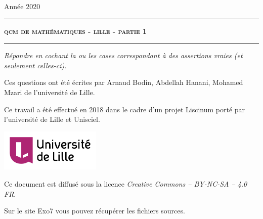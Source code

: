 \documentclass[12pt,a4paper]{article}
\begin{document}
 
 


\hfill{Ann\'ee 2020}

\vspace*{0.5ex}
\hrule\vspace*{1.5ex} 
\hfil\textsc{\textbf{\LARGE qcm de mathématiques - lille - partie 1}}
\vspace*{1.2ex} \hrule 
\vspace*{5ex} 


\vspace{4cm}

\begin{center}
\begin{minipage}{0.8\textwidth}
\center
\textit{Répondre en cochant la ou les cases correspondant à des assertions vraies (et seulement celles-ci).}
\end{minipage}
\end{center}
  
  


\vfill

\begin{center}
\begin{minipage}{0.8\textwidth}
\center
Ces questions ont été écrites par Arnaud Bodin, Abdellah Hanani, Mohamed Mzari de l'université de Lille.
  
  \medskip
  
Ce travail a été effectué en 2018 dans le cadre d'un projet Liscinum porté par l'université de Lille et Unisciel.
\end{minipage}

  \medskip

\qquad\qquad
\includegraphics[height=2cm]{ulnom_300}

  \medskip
  
Ce document est diffusé sous la licence \emph{Creative Commons -- BY-NC-SA -- 4.0 FR}.


Sur le site Exo7 vous pouvez récupérer les fichiers sources.

\end{center}
\end{document}
